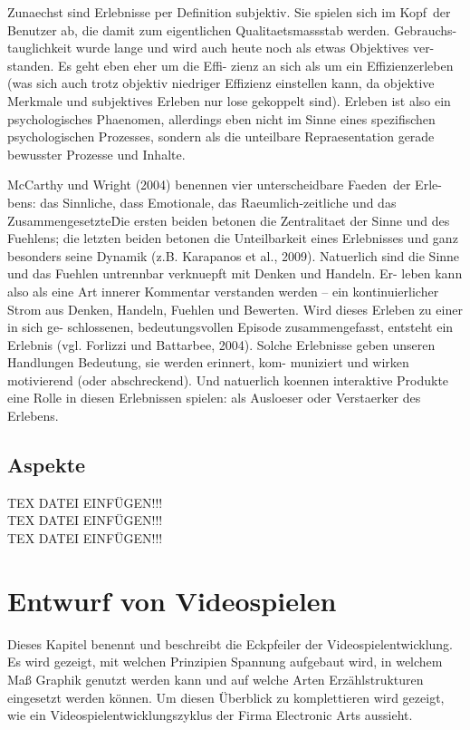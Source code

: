 Zunaechst sind Erlebnisse per Definition subjektiv. Sie spielen sich \glqq im Kopf\grqq\ der Benutzer ab, die damit zum eigentlichen Qualitaetsmassstab werden. Gebrauchs- tauglichkeit wurde lange und wird auch heute noch als etwas Objektives ver- standen. Es geht eben eher um die Effi- zienz an sich als um ein Effizienzerleben (was sich auch trotz objektiv niedriger Effizienz einstellen kann, da objektive Merkmale und subjektives Erleben nur lose gekoppelt sind). Erleben ist also ein psychologisches Phaenomen, allerdings eben nicht im Sinne eines spezifischen psychologischen Prozesses, sondern als die unteilbare Repraesentation gerade bewusster Prozesse und Inhalte.


McCarthy und Wright (2004) benennen vier unterscheidbare \glqq Faeden\grqq\ der Erle- bens: das Sinnliche, dass Emotionale, das Raeumlich-zeitliche und das \glqq Zusammengesetzte\grqq\. Die ersten beiden betonen die Zentralitaet der Sinne und des Fuehlens; die letzten beiden betonen die Unteilbarkeit eines Erlebnisses und ganz besonders seine Dynamik (z.B. Karapanos et al., 2009). Natuerlich sind die Sinne und das Fuehlen untrennbar verknuepft mit Denken und Handeln. Er- leben kann also als eine Art innerer Kommentar verstanden werden – ein kontinuierlicher Strom aus Denken, Handeln, Fuehlen und Bewerten. Wird dieses Erleben zu einer in sich ge- schlossenen, bedeutungsvollen Episode zusammengefasst, entsteht ein Erlebnis (vgl. Forlizzi und Battarbee, 2004). Solche Erlebnisse geben unseren Handlungen Bedeutung, sie werden erinnert, kom- muniziert und wirken motivierend (oder abschreckend). Und natuerlich koennen interaktive Produkte eine Rolle in diesen Erlebnissen spielen: als Ausloeser oder Verstaerker des Erlebens.






\section{Aspekte} 
TEX DATEI EINFÜGEN!!!\\
TEX DATEI EINFÜGEN!!!\\
TEX DATEI EINFÜGEN!!!\\


\chapter{Entwurf von Videospielen}
\label{cha:ext_tr_test}
Dieses Kapitel benennt und beschreibt die Eckpfeiler der Videospielentwicklung. Es wird gezeigt, mit welchen Prinzipien Spannung aufgebaut wird, in welchem Maß Graphik genutzt werden kann und auf welche Arten Erzählstrukturen eingesetzt werden können. Um diesen Überblick zu komplettieren wird gezeigt, wie ein Videospielentwicklungszyklus der Firma Electronic Arts aussieht.

